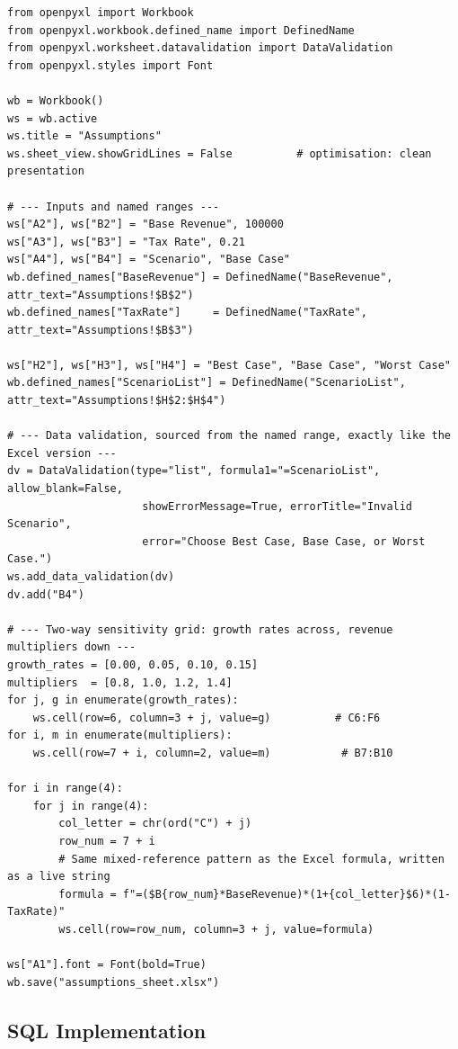 \documentclass[11pt,a4paper]{article}
\begin{document}
\begin{lstlisting}[style=pythonstyle, caption={The full assumptions sheet, built end-to-end with openpyxl}]
from openpyxl import Workbook
from openpyxl.workbook.defined_name import DefinedName
from openpyxl.worksheet.datavalidation import DataValidation
from openpyxl.styles import Font

wb = Workbook()
ws = wb.active
ws.title = "Assumptions"
ws.sheet_view.showGridLines = False          # optimisation: clean presentation

# --- Inputs and named ranges ---
ws["A2"], ws["B2"] = "Base Revenue", 100000
ws["A3"], ws["B3"] = "Tax Rate", 0.21
ws["A4"], ws["B4"] = "Scenario", "Base Case"
wb.defined_names["BaseRevenue"] = DefinedName("BaseRevenue", attr_text="Assumptions!$B$2")
wb.defined_names["TaxRate"]     = DefinedName("TaxRate", attr_text="Assumptions!$B$3")

ws["H2"], ws["H3"], ws["H4"] = "Best Case", "Base Case", "Worst Case"
wb.defined_names["ScenarioList"] = DefinedName("ScenarioList", attr_text="Assumptions!$H$2:$H$4")

# --- Data validation, sourced from the named range, exactly like the Excel version ---
dv = DataValidation(type="list", formula1="=ScenarioList", allow_blank=False,
                     showErrorMessage=True, errorTitle="Invalid Scenario",
                     error="Choose Best Case, Base Case, or Worst Case.")
ws.add_data_validation(dv)
dv.add("B4")

# --- Two-way sensitivity grid: growth rates across, revenue multipliers down ---
growth_rates = [0.00, 0.05, 0.10, 0.15]
multipliers  = [0.8, 1.0, 1.2, 1.4]
for j, g in enumerate(growth_rates):
    ws.cell(row=6, column=3 + j, value=g)          # C6:F6
for i, m in enumerate(multipliers):
    ws.cell(row=7 + i, column=2, value=m)           # B7:B10

for i in range(4):
    for j in range(4):
        col_letter = chr(ord("C") + j)
        row_num = 7 + i
        # Same mixed-reference pattern as the Excel formula, written as a live string
        formula = f"=($B{row_num}*BaseRevenue)*(1+{col_letter}$6)*(1-TaxRate)"
        ws.cell(row=row_num, column=3 + j, value=formula)

ws["A1"].font = Font(bold=True)
wb.save("assumptions_sheet.xlsx")
\end{lstlisting}

\subsection{SQL Implementation}
\end{document}
